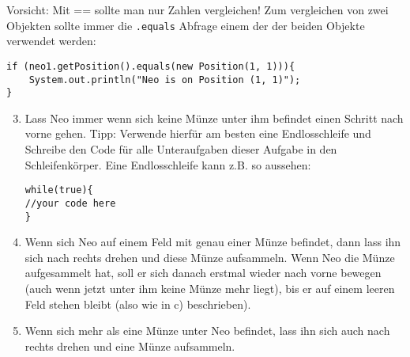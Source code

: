 \begin{Infobox}[\lstinline{==} und \lstinline{.equals()}]
	Vorsicht: Mit == sollte man nur Zahlen vergleichen! 
	Zum vergleichen von zwei Objekten sollte immer die \lstinline{.equals} Abfrage einem der der beiden Objekte verwendet werden:

	\begin{lstlisting}
if (neo1.getPosition().equals(new Position(1, 1))){
	System.out.println("Neo is on Position (1, 1)");
}
	\end{lstlisting}

\end{Infobox}


\begin{enumerate}\setcounter{enumi}{2}
	\item
		Lass Neo immer wenn sich keine Münze unter ihm befindet einen Schritt nach vorne gehen.
		Tipp: Verwende hierfür am besten eine Endlosschleife und Schreibe den Code für alle Unteraufgaben dieser Aufgabe in den Schleifenkörper.
		Eine Endlosschleife kann z.B. so aussehen:
	\begin{lstlisting}
while(true){
//your code here
}
	\end{lstlisting}

	\item
		Wenn sich Neo auf einem Feld mit genau einer Münze befindet, dann lass ihn sich nach rechts drehen und diese Münze aufsammeln. 
		Wenn Neo die Münze aufgesammelt hat, soll er sich danach erstmal wieder nach vorne bewegen (auch wenn jetzt unter ihm keine Münze mehr liegt), bis er auf einem leeren Feld stehen bleibt (also wie in c) beschrieben).


	\item
		Wenn sich mehr als eine Münze unter Neo befindet, lass ihn sich auch nach rechts drehen und eine Münze aufsammeln.
\end{enumerate}


